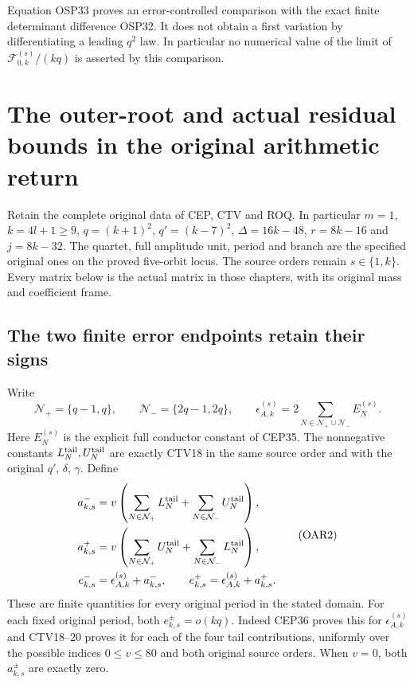 \documentclass[11pt,a4paper]{article}
\begin{document}
Equation OSP33 proves an error-controlled comparison with the exact
finite determinant difference OSP32. It does not obtain a first
variation by differentiating a leading $q^2$ law. In particular no
numerical value of the limit of $\mathcal F_{0,k}^{(s)}/(kq)$ is
asserted by this comparison.


\clearpage
\section{The outer-root and actual residual bounds in the original arithmetic return}
\label{sec:OAR}
Retain the complete original data of CEP, CTV and ROQ. In particular
$m=1$, $k=4l+1\ge9$, $q=(k+1)^2$, $q'=(k-7)^2$,
$\Delta=16k-48$, $r=8k-16$ and $j=8k-32$. The quartet, full
amplitude unit, period and branch are the specified original ones on
the proved five-orbit locus. The source orders remain $s\in\{1,k\}$.
Every matrix below is the actual matrix in those chapters, with its
original mass and coefficient frame.

\subsection{The two finite error endpoints retain their signs}
Write
\[
 \mathcal N_+=\{q-1,q\},\qquad
 \mathcal N_-=\{2q-1,2q\},\qquad
 \epsilon_{A,k}^{(s)}=2\sum_{N\in\mathcal N_+\cup\mathcal N_-}E_N^{(s)}.
 \tag{OAR1}
\]
Here $E_N^{(s)}$ is the explicit full conductor constant of CEP35.
The nonnegative constants $L_N^{\rm tail},U_N^{\rm tail}$ are
exactly CTV18 in the same source order and with the original
$q'$, $\delta$, $\gamma$. Define
\[
 \begin{split}
 a_{k,s}^-&=v\left(\sum_{N\in\mathcal N_+}L_N^{\rm tail}
                         +\sum_{N\in\mathcal N_-}U_N^{\rm tail}\right),\\
 a_{k,s}^+&=v\left(\sum_{N\in\mathcal N_+}U_N^{\rm tail}
                         +\sum_{N\in\mathcal N_-}L_N^{\rm tail}\right),\\
 e_{k,s}^-&=\epsilon_{A,k}^{(s)}+a_{k,s}^-,\qquad
 e_{k,s}^+=\epsilon_{A,k}^{(s)}+a_{k,s}^+.
 \end{split}\tag{OAR2}
\]
These are finite quantities for every original period in the stated
domain. For each fixed original period, both $e_{k,s}^\pm=o(kq)$.
Indeed CEP36 proves this for $\epsilon_{A,k}^{(s)}$ and CTV18--20
proves it for each of the four tail contributions, uniformly over
the possible indices $0\le v\le80$ and both original source orders.
When $v=0$, both $a_{k,s}^\pm$ are exactly zero.
\end{document}
